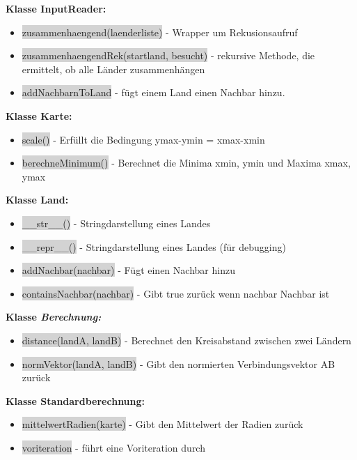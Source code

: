 \documentclass[a4paper,11pt]{article}
\begin{document}
{\textbf{Klasse InputReader:}\\
\begin{itemize}
	\item \colorbox{lightgray}{zusammenhaengend(laenderliste)} - Wrapper um Rekusionsaufruf
	\item \colorbox{lightgray}{zusammenhaengendRek(startland, besucht)} - rekursive Methode, die ermittelt, ob alle L\"ander zusammenh\"angen
	\item \colorbox{lightgray}{addNachbarnToLand} - f\"ugt einem Land einen Nachbar hinzu.\\
\end{itemize}
\textbf{Klasse Karte:}\\
\begin{itemize}
	\item \colorbox{lightgray}{scale()} - Erf\"ullt die Bedingung ymax-ymin = xmax-xmin
	\item \colorbox{lightgray}{berechneMinimum()} - Berechnet die Minima xmin, ymin und Maxima xmax, ymax
\end{itemize}
\textbf{Klasse Land:}\\
\begin{itemize}
	\item \colorbox{lightgray}{\_\_str\_\_()} - Stringdarstellung eines Landes
	\item \colorbox{lightgray}{\_\_repr\_\_()} - Stringdarstellung eines Landes (f\"ur debugging)
	\item \colorbox{lightgray}{addNachbar(nachbar)} - F\"ugt einen Nachbar hinzu
	\item \colorbox{lightgray}{containsNachbar(nachbar)} - Gibt true zur\"uck wenn nachbar Nachbar ist
\end{itemize}
\textbf{Klasse \textit{Berechnung:}}\\
\begin{itemize}
	\item \colorbox{lightgray}{distance(landA, landB)} - Berechnet den Kreisabstand zwischen zwei L\"andern
	\item \colorbox{lightgray}{normVektor(landA, landB)} - Gibt den normierten Verbindungsvektor AB zur\"uck
\end{itemize}
\textbf{Klasse Standardberechnung:}
\begin{itemize}
	\item \colorbox{lightgray}{mittelwertRadien(karte)} - Gibt den Mittelwert der Radien zur\"uck
	\item \colorbox{lightgray}{voriteration} - f\"uhrt eine Voriteration durch
\end{itemize}



}
\end{document}
